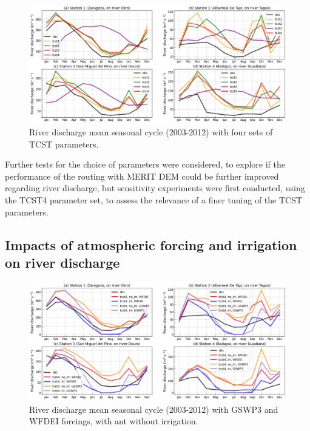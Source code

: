 \begin{figure}[htbp]
    \centering
    \includegraphics[width=\textwidth]{images/chap3/river_discharge/merit_tcst_4stations_SC.png}
    \caption{River discharge mean seasonal cycle (2003-2012) with four sets of TCST parameters.}
    \label{fig:merit_tcsts_stations_SC}
\end{figure}

Further tests for the choice of parameters were considered, to explore if the performance of the \native routing with MERIT DEM could be further improved regarding river discharge, but sensitivity experiments were first conducted, using the TCST4 parameter set, to assess the relevance of a finer tuning of the TCST parameters.

\subsection{Impacts of atmospheric forcing and irrigation on river discharge}
\label{sec:forcing_irr_reduced}

\begin{figure}[htbp]
    \centering
    \includegraphics[width=\textwidth]{images/chap3/river_discharge/merit_forcing_4stations_SC.png}
    \caption{River discharge mean seasonal cycle (2003-2012) with GSWP3 and WFDEI forcings, with ant without irrigation.}
    \label{fig:merit_forcing_stations_SC}
\end{figure}

